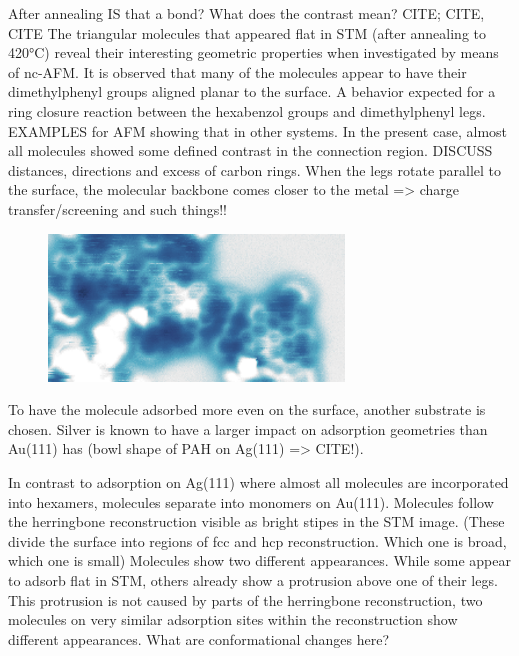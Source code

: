 After annealing
IS that a bond? What does the contrast mean? CITE; CITE, CITE
The triangular molecules that appeared flat in STM (after annealing to 420°C) reveal their interesting geometric properties when investigated by means of nc-AFM. It is observed that many of the molecules appear to have their dimethylphenyl groups aligned planar to the surface. A behavior expected for a ring closure reaction between the hexabenzol groups and dimethylphenyl legs. EXAMPLES for AFM showing that in other systems. In the present case, almost all molecules showed some defined contrast in the connection region. DISCUSS distances, directions and excess of carbon rings.
When the legs rotate parallel to the surface, the molecular backbone comes closer to the metal => charge transfer/screening and such things!!

\begin{figure}[] \centering
	\includegraphics[width=0.7\textwidth]{./images/hbbnc-annealed-afm}
	\caption{}
	\label{}
\end{figure}

To have the molecule adsorbed more even on the surface, another substrate is chosen. Silver is known to have a larger impact on adsorption geometries than Au(111) has (bowl shape of PAH on Ag(111) => CITE!).

In contrast to adsorption on Ag(111) where almost all molecules are incorporated into hexamers, molecules separate into monomers on Au(111). Molecules follow the herringbone reconstruction visible as bright stipes in the STM image. 
(These divide the surface into regions of fcc and hcp reconstruction.
Which one is broad, which one is small)
Molecules show two different appearances. While some appear to adsorb flat in STM, others already show a protrusion above one of their legs. This protrusion is not caused by parts of the herringbone reconstruction, two molecules on very similar adsorption sites within the reconstruction show different appearances.
What are conformational changes here?

